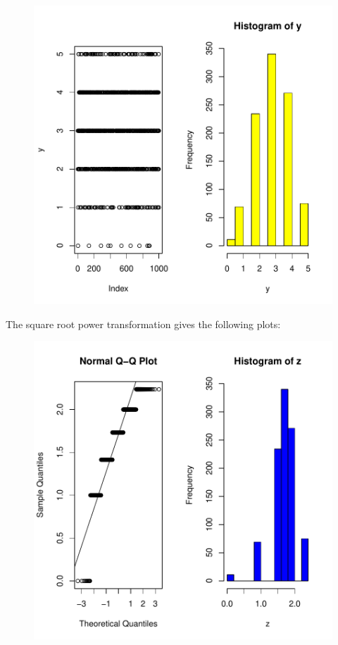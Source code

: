 \documentclass[12pt]{article}
\begin{document}
\begin{figure}[H]
\includegraphics{HW1-001}
\end{figure}

\clearpage
\item The square root power transformation gives the following plots:
\begin{figure}[H]
\includegraphics{HW1-002}
\end{figure}
\end{document}
